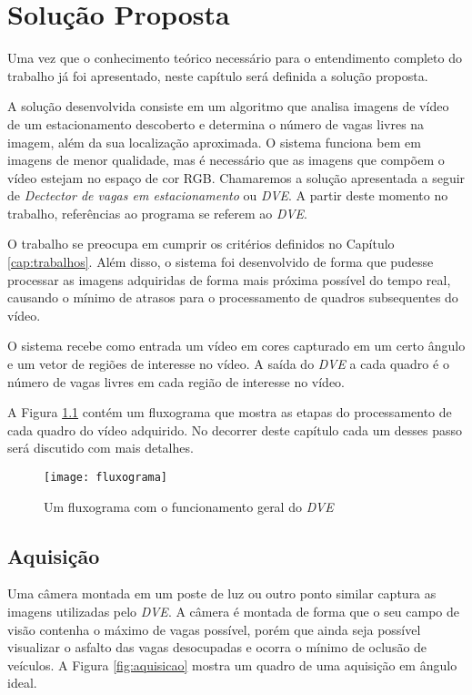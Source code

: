 \chapter{Solução Proposta}\label{cap:solucao}

Uma vez que o conhecimento teórico necessário para o entendimento completo do trabalho já foi apresentado, neste capítulo será definida a solução proposta.

A solução desenvolvida consiste em um algoritmo que analisa imagens de vídeo de um estacionamento descoberto e determina o número de vagas livres na imagem, além da sua localização aproximada. O sistema funciona bem em imagens de menor qualidade, mas é necessário que as imagens que compõem o vídeo estejam no espaço de cor RGB. Chamaremos a solução apresentada a seguir de \textit{Dectector de vagas em estacionamento} ou \textit{DVE}. A partir deste momento no trabalho, referências ao programa se referem ao \textit{DVE}.

O trabalho se preocupa em cumprir os critérios definidos no Capítulo \ref{cap:trabalhos}. Além disso, o sistema foi desenvolvido de forma que pudesse processar as imagens adquiridas de forma mais próxima possível do tempo real, causando o mínimo de atrasos para o processamento de quadros subsequentes do vídeo.

O sistema recebe como entrada um vídeo em cores capturado em um certo ângulo e um vetor de regiões de interesse no vídeo. A saída do \textit{DVE} a cada quadro é o número de vagas livres em cada região de interesse no vídeo.

A Figura \ref{fig:fluxograma} contém um fluxograma que mostra as etapas do processamento de cada quadro do vídeo adquirido. No decorrer deste capítulo cada um desses passo será discutido com mais detalhes.

\begin{figure}
	\centering
	\texttt{[image: fluxograma]}
	\caption{Um fluxograma com o funcionamento geral do \textit{DVE}}
	\label{fig:fluxograma}
	\centering
\end{figure}



\section{Aquisição}\label{sec:aquisicao}

Uma câmera montada em um poste de luz ou outro ponto similar captura as imagens utilizadas pelo \textit{DVE}. A câmera é montada de forma que o seu campo de visão contenha o máximo de vagas possível, porém que ainda seja possível visualizar o asfalto das vagas desocupadas e ocorra o mínimo de oclusão de veículos. A Figura \ref{fig:aquisicao} mostra um quadro de uma aquisição em ângulo ideal.

